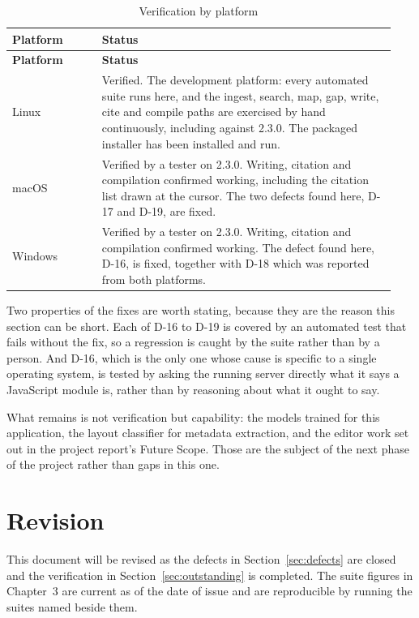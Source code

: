 \documentclass[12pt,a4paper]{report}
\begin{document}
\begin{longtable}{@{}p{0.22\linewidth}p{0.72\linewidth}@{}}
\caption{Verification by platform}\label{tab:outstanding}\\
\toprule
\textbf{Platform} & \textbf{Status} \\
\midrule
\endfirsthead
\toprule
\textbf{Platform} & \textbf{Status} \\
\midrule
\endhead

Linux &
  Verified. The development platform: every automated suite runs here, and the
  ingest, search, map, gap, write, cite and compile paths are exercised by hand
  continuously, including against 2.3.0. The packaged installer has been
  installed and run. \\
\addlinespace
macOS &
  Verified by a tester on 2.3.0. Writing, citation and compilation confirmed
  working, including the citation list drawn at the cursor. The two defects
  found here, D-17 and D-19, are fixed. \\
\addlinespace
Windows &
  Verified by a tester on 2.3.0. Writing, citation and compilation confirmed
  working. The defect found here, D-16, is fixed, together with D-18 which was
  reported from both platforms. \\
\bottomrule
\end{longtable}

Two properties of the fixes are worth stating, because they are the reason this
section can be short. Each of D-16 to D-19 is covered by an automated test that
fails without the fix, so a regression is caught by the suite rather than by a
person. And D-16, which is the only one whose cause is specific to a single
operating system, is tested by asking the running server directly what it says
a JavaScript module is, rather than by reasoning about what it ought to say.

What remains is not verification but capability: the models trained for this
application, the layout classifier for metadata extraction, and the editor work
set out in the project report's Future Scope. Those are the subject of the next
phase of the project rather than gaps in this one.

\section{Revision}

This document will be revised as the defects in Section~\ref{sec:defects} are closed and the
verification in Section~\ref{sec:outstanding} is completed.
The suite figures in Chapter~3 are current as of the date of issue and are
reproducible by running the suites named beside them.
\end{document}
